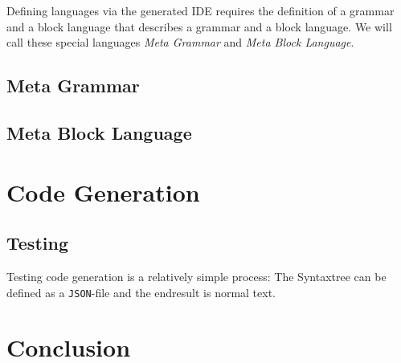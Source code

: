 Defining languages via the generated IDE requires the definition of a grammar and a block language that describes a grammar and a block language. We will call these special languages \textit{Meta Grammar} and \textit{Meta Block Language}.

\subsection{Meta Grammar}

\subsection{Meta Block Language}

\section{Code Generation}
\label{sec:code-generation-detail}

\subsection{Testing}

Testing code generation is a relatively simple process: The Syntaxtree can be defined as a \texttt{JSON}-file and the endresult is normal text.

\section{Conclusion}


